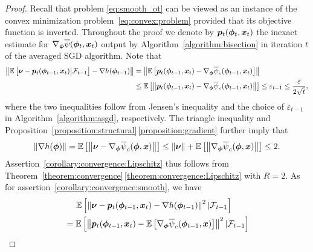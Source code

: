 \documentclass[11pt, a4paper, oneside, reqno]{article}
\begin{document}
	\begin{proof}
	    Recall that problem \eqref{eq:smooth_ot} can be viewed as an instance of the convex minimization problem~\eqref{eq:convex:problem} provided that its objective function is inverted. %
	    Throughout the proof we denote by $\boldsymbol p_t(\boldsymbol \phi_t, \boldsymbol x_t)$ the inexact estimate for $\nabla_{\boldsymbol \phi} \overline\psi(\boldsymbol \phi_t, \boldsymbol x_t)$ output by Algorithm~\ref{algorithm:bisection} in iteration $t$ of the averaged SGD algorithm. Note that
	    \begin{align*}
	        \left\| \mathbb{E} \left[ \bm \nu - \bm p_t(\bm \phi_{t-1}, \bm x_t) \big| \mathcal F_{t-1} \right] - \nabla h(\bm \phi_{t-1}) \right\| 
    	    &= \left\| \mathbb{E} \left[ \bm p_t(\bm \phi_{t-1}, \bm x_t) - \nabla_{\boldsymbol \phi} \overline\psi_c(\boldsymbol \phi_{t-1}, \boldsymbol x_t)\right] \right\| \\
    	    &\leq \mathbb{E} \left[ \left\| \bm p_t(\bm \phi_{t-1}, \bm x_t) - \nabla_{\boldsymbol \phi} \overline\psi_c(\boldsymbol \phi_{t-1}, \boldsymbol x_t) \right\| \right]
    	    \leq \varepsilon_{t-1} \leq \frac{\bar \varepsilon}{2 \sqrt{t}},
	    \end{align*}
	    where the two inequalities follow from Jensen's inequality and the choice of $\varepsilon_{t-1}$ in Algorithm~\ref{algorithm:asgd}, respectively. The triangle inequality and Proposition~\ref{proposition:structural}\,\ref{proposition:gradient} further imply that
	    \begin{align*}
	        \left\| \nabla h(\bm \phi) \right\| 
			= \mathbb{E} \left[ \left\| \boldsymbol \nu - \nabla_{\boldsymbol \phi} \overline\psi_c(\boldsymbol \phi, \boldsymbol x) \right\| \right]
			\leq \left\| \boldsymbol \nu \right\| + \mathbb{E} \left[ \left\| \nabla_{\boldsymbol \phi} \overline\psi_c(\boldsymbol \phi, \boldsymbol x) \right\| \right] \leq 2.
	    \end{align*}
	    Assertion~\ref{corollary:convergence:Lipschitz} thus follows from Theorem~\ref{theorem:convergence}\,\ref{theorem:convergence:Lipschitz} with $R=2$. As for assertion~\ref{corollary:convergence:smooth}, we have
	    \begin{align*}
	        &\phantom{=}~\; \EE \left[\left\| \bm \nu - \bm p_t(\bm \phi_{t-1}, \bm x_t) - \nabla h(\bm \phi_{t-1}) \right\|^2 | \mathcal F_{t-1} \right] \\
	        &= \EE \left[\left\| \bm p_t(\bm \phi_{t-1}, \bm x_t) - \EE \left[ \nabla_{\bs \phi} \overline\psi_c(\bs \phi_{t-1}, \bs x) \right] \right\|^2 | \mathcal F_{t-1} \right] \\

\end{align*}
\end{proof}
\end{document}
